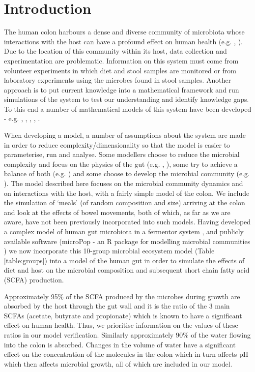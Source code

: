 \documentclass[a4paper]{article}
\begin{document}
\section*{Introduction}
The human colon harbours a dense and diverse community of microbiota whose interactions with the host can have a profound effect on human health (e.g. \cite{health1}, \cite{health2}). Due to the location of this community within its host, data collection and experimentation are problematic. Information on this system must come from volunteer experiments in which diet and stool samples are monitored or from laboratory experiments using the microbes found in stool samples. Another approach is to put current knowledge into a mathematical framework and run simulations of the system to test our understanding and identify knowledge gaps. To this end a number of mathematical models of this system have been developed - e.g. 
\cite{Cremer16}, \cite{Cremer17}, \cite{Munoz}, \cite{smith}, \cite{moorthy}.

When developing a model, a number of assumptions about the system are made in order to reduce complexity/dimensionality so that the model is easier to parameterise, run and analyse. Some modellers choose to reduce the microbial complexity and focus on the physics of the gut (e.g. \cite{Cremer16}, \cite{Cremer17}), some try to achieve a balance of both (e.g. \cite{Munoz}) and some choose to develop the microbial community (e.g. \cite{smith}). The model described here focuses on the microbial community dynamics and on interactions with the host, with a fairly simple model of the colon. We include the simulation of `meals' (of random composition and size) arriving at the colon and look at the effects of bowel movements, both of which, as far as we are aware, have not been previously incorporated into such models.
Having developed a complex model of human gut microbiota in a fermentor system \citep{Kettle2015}, and publicly available software (microPop - an R package for modelling microbial communities \citep{Kettle2018}) we now incorporate this 10-group microbial ecosystem model (Table \ref{table:groups}) into a model of the human gut in order to simulate the effects of diet and host on the microbial composition and subsequent short chain fatty acid (SCFA) production. 

Approximately 95\% of the SCFA produced by the microbes during growth are absorbed by the host through the gut wall and it is the ratio of the 3 main SCFAs (acetate, butyrate and propionate) which is known to have a significant effect on human health. Thus, we prioritise information on the values of these ratios in our model verification.
Similarly approximately 90\% of the water flowing into the colon is absorbed. Changes in the volume of water have a significant effect on the concentration of the molecules in the colon which in turn affects pH which then affects microbial growth, all of which are included in our model.
\end{document}
